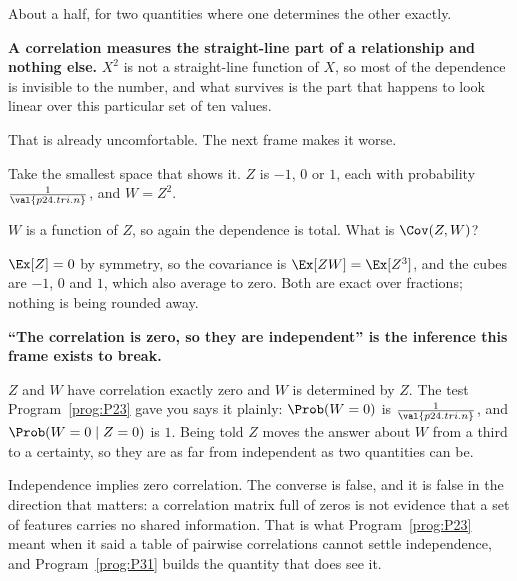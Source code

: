 \begin{fr}

About a half, for two quantities where one determines the other exactly.

\textbf{A correlation measures the straight-line part of a relationship and
nothing else.} $X^{2}$ is not a straight-line function of $X$, so most of the
dependence is invisible to the number, and what survives is the part that
happens to look linear over this particular set of ten values.

That is already uncomfortable. The next frame makes it worse.
\end{fr}

\begin{fr}
Take the smallest space that shows it. $Z$ is $-1$, $0$ or $1$, each with
probability $\frac{1}{\val{p24.tri.n}}$, and $W = Z^{2}$.

$W$ is a function of $Z$, so again the dependence is total. What is
$\Cov(Z, W)$?
\dotline
\nextframe
\end{fr}

\begin{fr}

$\Ex[Z] = 0$ by symmetry, so the covariance is $\Ex[ZW] = \Ex[Z^{3}]$, and the
cubes are $-1$, $0$ and $1$, which also average to zero. Both are exact over
fractions; nothing is being rounded away.

\begin{trapbox}
\textbf{\enquote{The correlation is zero, so they are independent} is the
inference this frame exists to break.}

$Z$ and $W$ have correlation exactly zero and $W$ is determined by $Z$. The
test Program~\ref{prog:P23} gave you says it plainly:
$\Prob(W = 0)$ is $\frac{1}{\val{p24.tri.n}}$, and
$\Prob(W = 0 \mid Z = 0)$ is $1$. Being told $Z$ moves the answer about $W$
from a third to a certainty, so they are as far from independent as two
quantities can be.

Independence implies zero correlation. The converse is false, and it is false
in the direction that matters: a correlation matrix full of zeros is not
evidence that a set of features carries no shared information. That is what
Program~\ref{prog:P23} meant when it said a table of pairwise correlations
cannot settle independence, and Program~\ref{prog:P31} builds the quantity
that does see it.
\end{trapbox}
\end{fr}

